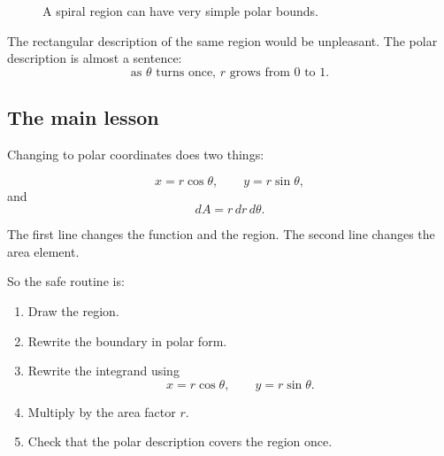 \begin{figure}[h]
\centering
{}
\caption{A spiral region can have very simple polar bounds.}
\end{figure}

The rectangular description of the same region would be unpleasant.  The polar
description is almost a sentence:
\[
    \text{as \(\theta\) turns once, \(r\) grows from \(0\) to \(1\).}
\]

\subsection{The main lesson}

Changing to polar coordinates does two things:

\[
    x=r\cos\theta,\qquad y=r\sin\theta,
\]
and
\[
    dA=r\,dr\,d\theta.
\]

The first line changes the function and the region.  The second line changes the area
element.

So the safe routine is:

\begin{enumerate}
\item Draw the region.

\item Rewrite the boundary in polar form.

\item Rewrite the integrand using
\[
    x=r\cos\theta,\qquad y=r\sin\theta.
\]

\item Multiply by the area factor \(r\).

\item Check that the polar description covers the region once.
\end{enumerate}

